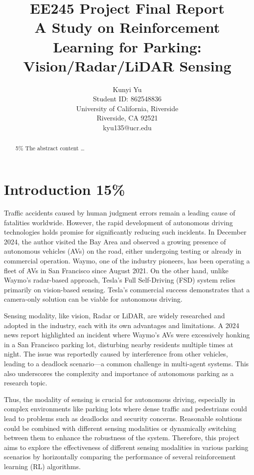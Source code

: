 \documentclass{article}
\title{EE245 Project Final Report \\ \large A Study on Reinforcement Learning for Parking: Vision/Radar/LiDAR Sensing}
\author{
  Kunyi Yu\\
  Student ID: 862548836 \\
  University of California, Riverside\\
  Riverside, CA 92521\\
  kyu135@ucr.edu
}
\begin{document}
\maketitle

\begin{abstract}
  5\% The abstract content \dots
\end{abstract}


\section{Introduction 15\%}

Traffic accidents caused by human judgment errors remain a leading cause of fatalities worldwide. However, the rapid development of autonomous driving technologies holds promise for significantly reducing such incidents. In December 2024, the author visited the Bay Area and observed a growing presence of autonomous vehicles (AVs) on the road, either undergoing testing or already in commercial operation. Waymo, one of the industry pioneers, has been operating a fleet of AVs in San Francisco since August 2021. On the other hand, unlike Waymo’s radar-based approach, Tesla’s Full Self-Driving (FSD) system relies primarily on vision-based sensing. Tesla’s commercial success demonstrates that a camera-only solution can be viable for autonomous driving.

Sensing modality, like vision, Radar or LiDAR, are widely researched and adopted in the industry, each with its own advantages and limitations. A 2024 news report \cite{news2024} highlighted an incident where Waymo’s AVs were excessively honking in a San Francisco parking lot, disturbing nearby residents multiple times at night. The issue was reportedly caused by interference from other vehicles, leading to a deadlock scenario—a common challenge in multi-agent systems. This also underscores the complexity and importance of autonomous parking as a research topic.

Thus, the modality of sensing is crucial for autonomous driving, especially in complex environments like parking lots where dense traffic and pedestrians could lead to problems such as deadlocks and security concerns. Reasonable solutions could be combined with different sensing modalities or dynamically switching between them to enhance the robustness of the system. Therefore, this project aims to explore the effectiveness of different sensing modalities in various parking scenarios by horizontally comparing the performance of several reinforcement learning (RL) algorithms. 
\end{document}
